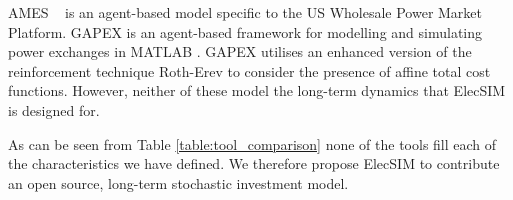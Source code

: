 AMES ~\cite{Sun2007} is an agent-based model specific to the US Wholesale Power Market Platform. GAPEX \cite{Cincotti2013} is an agent-based framework for modelling and simulating power exchanges in MATLAB . GAPEX utilises an enhanced version of the reinforcement technique Roth-Erev to consider the presence of affine total cost functions. However, neither of these model the long-term dynamics that ElecSIM is designed for.

As can be seen from Table \ref{table:tool_comparison} none of the tools fill each of the characteristics we have defined. We therefore propose ElecSIM to contribute an open source, long-term stochastic investment model. 






